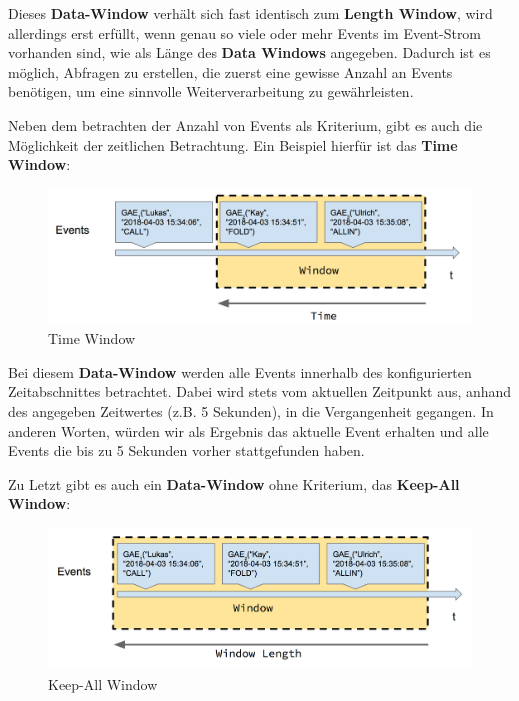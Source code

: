 Dieses \textbf{Data-Window} verhält sich fast identisch zum \textbf{Length Window}, wird allerdings erst erfüllt, wenn genau so viele oder mehr Events im Event-Strom vorhanden sind, wie als Länge des \textbf{Data Windows} angegeben. Dadurch ist es möglich, Abfragen zu erstellen, die zuerst eine gewisse Anzahl an Events benötigen, um eine sinnvolle Weiterverarbeitung zu gewährleisten.

Neben dem betrachten der Anzahl von Events als Kriterium, gibt es auch die Möglichkeit der zeitlichen Betrachtung. Ein Beispiel hierfür ist das \textbf{Time Window}:

\begin{figure}[ht]
	\centering
	\includegraphics[width=\textwidth,height=\textheight,keepaspectratio]{images/data_window_time.png}
	\caption{Time Window}
	\label{TimeWindow}
\end{figure}

Bei diesem \textbf{Data-Window} werden alle Events innerhalb des konfigurierten Zeitabschnittes betrachtet.
Dabei wird stets vom aktuellen Zeitpunkt aus, anhand des angegeben Zeitwertes (z.B. 5 Sekunden), in die Vergangenheit gegangen. In anderen Worten, würden wir als Ergebnis das aktuelle Event erhalten und alle Events die bis zu 5 Sekunden vorher stattgefunden haben.

Zu Letzt gibt es auch ein \textbf{Data-Window} ohne Kriterium, das \textbf{Keep-All Window}:

\begin{figure}[ht]
	\centering
	\includegraphics[width=\textwidth,height=\textheight,keepaspectratio]{images/data_window_keep_all.png}
	\caption{Keep-All Window}
	\label{KeepAllWindow}
\end{figure}

